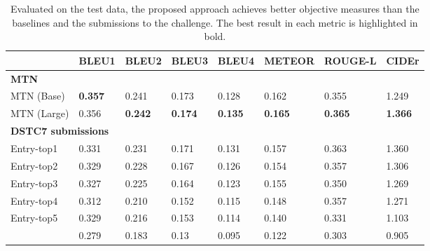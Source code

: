 \documentclass[11pt,a4paper]{article}
\begin{document}
\begin{table*}[htbp]
    \centering
    \resizebox{1.0\textwidth}{!} {
    \begin{tabular}{llllllll}
    \hline
            & \textbf{BLEU1} & \textbf{BLEU2} & \textbf{BLEU3} & \textbf{BLEU4} & \textbf{METEOR} & \textbf{ROUGE-L} & \textbf{CIDEr} \\ \hline
            \multicolumn{8}{l}{\textbf{MTN}}                                          \\ \hline
    MTN (Base)  & \textbf{0.357} & 0.241          & 0.173          & 0.128          & 0.162           & 0.355            & 1.249          \\ 
    MTN (Large) & 0.356          & \textbf{0.242} & \textbf{0.174} & \textbf{0.135} & \textbf{0.165}  & \textbf{0.365}   & \textbf{1.366} \\ \hline
             \multicolumn{8}{l}{\textbf{DSTC7 submissions}}                                                                          \\ \hline
    Entry-top1  & 0.331          & 0.231          & 0.171          & 0.131          & 0.157           & 0.363            & 1.360          \\ 
    Entry-top2  & 0.329          & 0.228          & 0.167          & 0.126          & 0.154           & 0.357            & 1.306          \\ 
    Entry-top3  & 0.327          & 0.225          & 0.164          & 0.123          & 0.155           & 0.350            & 1.269          \\ 
    Entry-top4  & 0.312          & 0.210          & 0.152          & 0.115          & 0.148           & 0.357            & 1.271          \\ 
    Entry-top5  & 0.329          & 0.216          & 0.153          & 0.114          & 0.140           & 0.331            & 1.103          \\ 
   \cite{hori2018end}         & 0.279          & 0.183          & 0.13           & 0.095          & 0.122           & 0.303            & 0.905          \\ \hline
    \end{tabular}
    }
    \caption{Evaluated on the test data, the proposed approach achieves better objective measures than the baselines and the submissions to the challenge. The best result in each metric is highlighted in bold.}
    \label{tab:dstc_result}
\end{table*}
\end{document}
